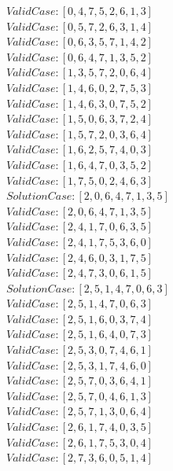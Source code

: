 \documentclass[a4paper,12pt]{article}
\begin{document}
				$Valid Case   : [0, 4, 7, 5, 2, 6, 1, 3]$\\
				$Valid Case   : [0, 5, 7, 2, 6, 3, 1, 4]$\\
				$Valid Case   : [0, 6, 3, 5, 7, 1, 4, 2]$\\
				$Valid Case   : [0, 6, 4, 7, 1, 3, 5, 2]$\\
				$Valid Case   : [1, 3, 5, 7, 2, 0, 6, 4]$\\
				$Valid Case   : [1, 4, 6, 0, 2, 7, 5, 3]$\\
				$Valid Case   : [1, 4, 6, 3, 0, 7, 5, 2]$\\
				$Valid Case   : [1, 5, 0, 6, 3, 7, 2, 4]$\\
				$Valid Case   : [1, 5, 7, 2, 0, 3, 6, 4]$\\
				$Valid Case   : [1, 6, 2, 5, 7, 4, 0, 3]$\\
				$Valid Case   : [1, 6, 4, 7, 0, 3, 5, 2]$\\
				$Valid Case   : [1, 7, 5, 0, 2, 4, 6, 3]$\\
				$Solution Case: [2, 0, 6, 4, 7, 1, 3, 5]$\\
				$Valid Case   : [2, 0, 6, 4, 7, 1, 3, 5]$\\
				$Valid Case   : [2, 4, 1, 7, 0, 6, 3, 5]$\\
				$Valid Case   : [2, 4, 1, 7, 5, 3, 6, 0]$\\
				$Valid Case   : [2, 4, 6, 0, 3, 1, 7, 5]$\\
				$Valid Case   : [2, 4, 7, 3, 0, 6, 1, 5]$\\
				$Solution Case: [2, 5, 1, 4, 7, 0, 6, 3]$\\
				$Valid Case   : [2, 5, 1, 4, 7, 0, 6, 3]$\\
				$Valid Case   : [2, 5, 1, 6, 0, 3, 7, 4]$\\
				$Valid Case   : [2, 5, 1, 6, 4, 0, 7, 3]$\\
				$Valid Case   : [2, 5, 3, 0, 7, 4, 6, 1]$\\
				$Valid Case   : [2, 5, 3, 1, 7, 4, 6, 0]$\\
				$Valid Case   : [2, 5, 7, 0, 3, 6, 4, 1]$\\
				$Valid Case   : [2, 5, 7, 0, 4, 6, 1, 3]$\\
				$Valid Case   : [2, 5, 7, 1, 3, 0, 6, 4]$\\
				$Valid Case   : [2, 6, 1, 7, 4, 0, 3, 5]$\\
				$Valid Case   : [2, 6, 1, 7, 5, 3, 0, 4]$\\
				$Valid Case   : [2, 7, 3, 6, 0, 5, 1, 4]$\\
\end{document}
